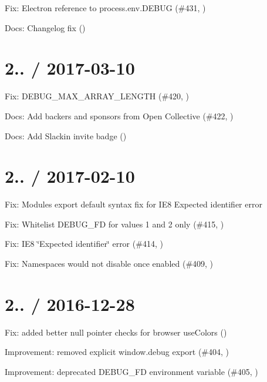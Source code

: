 \begin{DoxyItemize}
\item Fix\+: Electron reference to {\ttfamily process.\+env.\+D\+E\+B\+UG} (\#431, )
\item Docs\+: Changelog fix ()
\end{DoxyItemize}

\section*{2.. / 2017-\/03-\/10 }


\begin{DoxyItemize}
\item Fix\+: D\+E\+B\+U\+G\+\_\+\+M\+A\+X\+\_\+\+A\+R\+R\+A\+Y\+\_\+\+L\+E\+N\+G\+TH (\#420, )
\item Docs\+: Add backers and sponsors from Open Collective (\#422, )
\item Docs\+: Add Slackin invite badge ()
\end{DoxyItemize}

\section*{2.. / 2017-\/02-\/10 }


\begin{DoxyItemize}
\item Fix\+: Module\textquotesingle{}s {\ttfamily export default} syntax fix for I\+E8 {\ttfamily Expected identifier} error
\item Fix\+: Whitelist D\+E\+B\+U\+G\+\_\+\+FD for values 1 and 2 only (\#415, )
\item Fix\+: I\+E8 \char`\"{}\+Expected identifier\char`\"{} error (\#414, )
\item Fix\+: Namespaces would not disable once enabled (\#409, )
\end{DoxyItemize}

\section*{2.. / 2016-\/12-\/28 }


\begin{DoxyItemize}
\item Fix\+: added better null pointer checks for browser use\+Colors ()
\item Improvement\+: removed explicit {\ttfamily window.\+debug} export (\#404, )
\item Improvement\+: deprecated {\ttfamily D\+E\+B\+U\+G\+\_\+\+FD} environment variable (\#405, )
\end{DoxyItemize}

